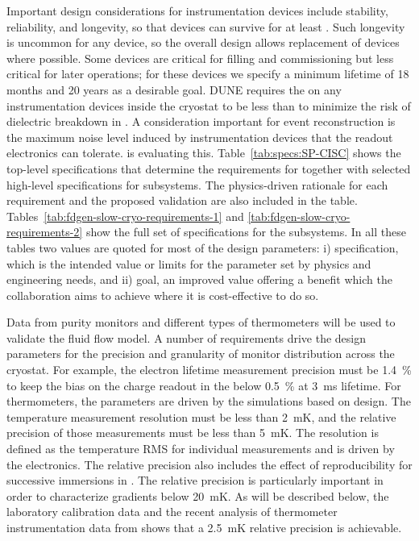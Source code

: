 Important design considerations for instrumentation devices include stability, reliability, and longevity, so that devices can survive for at least \dunelifetime.
Such longevity is uncommon for any device, so the overall design allows replacement of devices where possible.
Some devices are critical for filling and commissioning but less critical for later operations; for these devices we specify a minimum lifetime of 18 months and 20 years as a desirable goal.
DUNE requires the \efield  on any instrumentation devices inside the cryostat to be less than \localefield to minimize the risk of dielectric breakdown in . 
A consideration important for event reconstruction is the maximum noise level induced by instrumentation devices that the readout electronics  can tolerate.  is evaluating this. 
Table~\ref{tab:specs:SP-CISC} shows the top-level specifications that determine the requirements for  together with selected high-level specifications for  subsystems. The physics-driven rationale for each requirement and the proposed validation are also included in the table.
Tables~\ref{tab:fdgen-slow-cryo-requirements-1} and \ref{tab:fdgen-slow-cryo-requirements-2} show the full set of specifications 
for the  subsystems. In all these tables two values are quoted for most of the design parameters: 
 i) specification, which is the intended value or limits for the parameter set by physics and engineering needs, and ii) goal, an improved value offering a benefit which the collaboration aims to achieve where it is cost-effective to do so.

Data from purity monitors and different types of thermometers will be used to validate the  fluid flow model. 
A number of requirements drive the design parameters for the precision and granularity of monitor distribution across the cryostat. 
For example, the electron lifetime measurement precision must be \SI{1.4}{\%} to keep the bias on the charge readout in the  below \SI{0.5}{\%} at \SI{3}{ms} lifetime. For thermometers, the %
parameters are driven by the  simulations based on  design.
The temperature measurement resolution must be less than \SI{2}{mK}, and the relative precision of those measurements must be less than \SI{5}{mK}. The resolution is defined as the temperature RMS for individual measurements and is driven by the electronics. The relative precision also includes the effect of reproducibility for successive immersions in . 
The relative precision is particularly important in order to characterize %
gradients below \SI{20}{mK}. %
As will be described below, the laboratory calibration data and the recent analysis of thermometer instrumentation data from  shows that a \SI{2.5}{mK} relative precision is achievable. 

